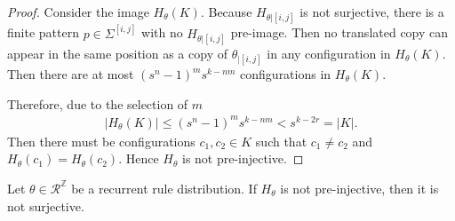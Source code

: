 \documentclass[runningheads]{llncs}
\newcommand{\Z}{\mathbb{Z}}
\begin{document}
\begin{proof}
Consider the image $H_\theta (K)$. Because $H_{\theta|[i,j]}$ is not surjective, there is a finite pattern $p \in \Sigma^{[i,j]}$ with no $H_{\theta|[i,j]}$ pre-image. Then no translated copy can appear in the same position as a copy of $\theta_{|[i,j]}$ in any configuration in $H_\theta (K)$. Then there are at most $(s^n-1)^ms^{k-nm}$ configurations in $H_\theta (K)$. 

Therefore, due to the selection of $m$
\begin{align*}
|H_\theta (K)| \leq (s^n -1)^m s^{k-nm} < s^{k-2r} = |K|.
\end{align*}
Then there must be configurations $c_1, c_2 \in K$ such that $c_1 \neq c_2$ and $H_\theta (c_1) = H_\theta (c_2)$. Hence $H_\theta$ is not pre-injective.

\end{proof}

\begin{lemma} \label{rgoe2}
Let $\theta \in \mathcal{R}^\Z$ be a recurrent rule distribution. If $H_\theta$ is not pre-injective, then it is not surjective. 
\end{lemma}
\end{document}
